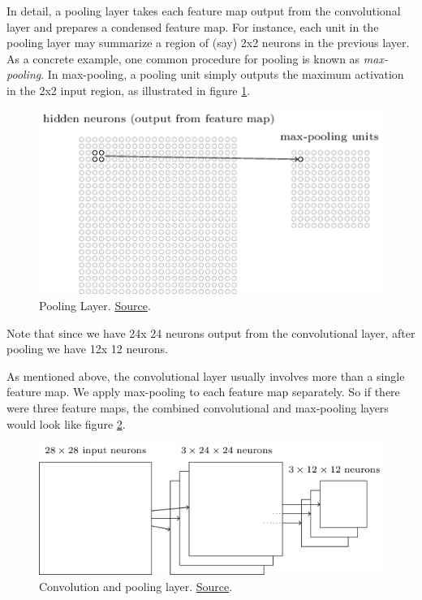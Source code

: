 \documentclass[a4paper]{tufte-handout}
\begin{document}
In detail, a pooling layer takes each feature map output from the
convolutional layer and prepares a condensed feature map. For instance,
each unit in the pooling layer may summarize a region of (say) 2x2
neurons in the previous layer. As a concrete example, one common
procedure for pooling is known as \emph{max-pooling}. In max-pooling, a
pooling unit simply outputs the maximum activation in the 2x2 input
region, as illustrated in figure \ref{fig:pool}.

\begin{figure}[!htb]
\includegraphics[width=0.8\linewidth]{max_pooling}
\caption{Pooling Layer.
\href{http://neuralnetworksanddeeplearning.com/chap6.html}{Source}. }
\label{fig:pool}
\end{figure}

Note that since we have 24x
24 neurons output from the convolutional
layer, after pooling we have 12x
12 neurons.

As mentioned above, the convolutional layer usually involves more than a
single feature map. We apply max-pooling to each feature map separately.
So if there were three feature maps, the combined convolutional and
max-pooling layers would look like figure \ref{fig:pool2}.

\begin{figure}
\includegraphics[width=\linewidth]{max_pooling2}
\caption{Convolution and pooling layer.
\href{http://neuralnetworksanddeeplearning.com/chap6.html}{Source}. }
\label{fig:pool2}
\end{figure}
\end{document}
